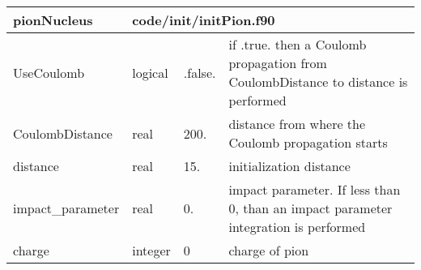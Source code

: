 \documentclass{article}
\begin{document}
\begin{longtable}{llll}
\toprule
\textbf{\large{pionNucleus}} & \multicolumn{3}{l}{\footnotesize{code/init/initPion.f90}}\\*
\midrule
\endfirsthead
\midrule
\endhead
UseCoulomb & \begin{minipage}[t]{2cm}logical\end{minipage} & \begin{minipage}[t]{2cm}.false.\end{minipage} & \begin{minipage}[t]{12cm}if .true. then a Coulomb propagation from CoulombDistance to distance is performed\end{minipage}\\*
\midrule
CoulombDistance & \begin{minipage}[t]{2cm}real\end{minipage} & \begin{minipage}[t]{2cm}200.\end{minipage} & \begin{minipage}[t]{12cm}distance from where the Coulomb propagation starts\end{minipage}\\*
\midrule
distance & \begin{minipage}[t]{2cm}real\end{minipage} & \begin{minipage}[t]{2cm}15.\end{minipage} & \begin{minipage}[t]{12cm}initialization distance\end{minipage}\\*
\midrule
impact\_parameter & \begin{minipage}[t]{2cm}real\end{minipage} & \begin{minipage}[t]{2cm}0.\end{minipage} & \begin{minipage}[t]{12cm}impact parameter. If less than 0, than an impact parameter integration is performed\end{minipage}\\*
\midrule
charge & \begin{minipage}[t]{2cm}integer\end{minipage} & \begin{minipage}[t]{2cm}0\end{minipage} & \begin{minipage}[t]{12cm}charge of pion\end{minipage}\\*

\end{longtable}
\end{document}
